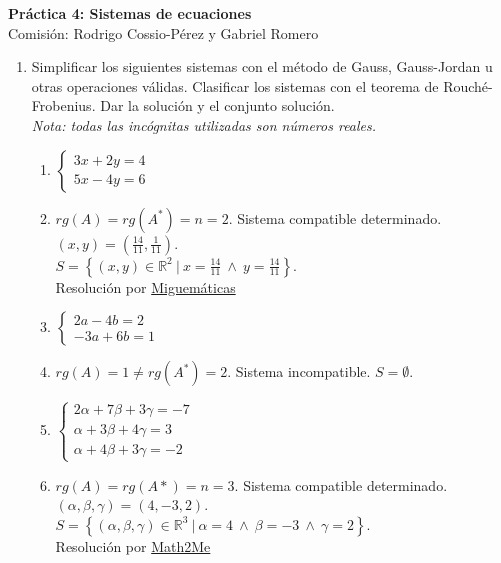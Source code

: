 \documentclass[a4paper]{article}
\newcommand{\answer}{\item[**]}
\newcommand{\exercise}{\item}
\begin{document}
\noindent \hrulefill 
\vspace{-7pt}
\begin{center} 
	\textbf{ Práctica 4: Sistemas de ecuaciones } \\
	Comisión: Rodrigo Cossio-Pérez y Gabriel Romero
\end{center}
\vspace{-10pt}
\hrulefill


\begin{enumerate}

	\exercise Simplificar los siguientes sistemas con el método de Gauss, Gauss-Jordan u otras operaciones válidas. Clasificar los sistemas con el teorema de Rouché-Frobenius. Dar la solución y el conjunto solución. \\ \textit{Nota: todas las incógnitas utilizadas son números reales.}
	\begin{multicols}{2}
	\begin{enumerate} [label=(\alph*)]
		\item $\left\{\begin{matrix} 3x+2y=4\\ 5x-4y=6 \end{matrix}\right.$
		\answer $rg(A)=rg(A^*)=n=2$. Sistema compatible determinado. \\ $(x,y)=\left(\frac{14}{11},\frac{1}{11}\right)$. \\ $S=\left\{(x,y)\in \mathbb{R}^2 ~|~ x=\frac{14}{11} ~\land~ y=\frac{14}{11}\right\}$. \\ Resolución por \href{https://youtu.be/OE8e70VO_CE}{Miguemáticas}

		\item $\left\{\begin{matrix} 2a-4b=2\\ -3a+6b=1 \end{matrix}\right.$
		\answer $rg(A) = 1 \neq rg(A^*) =2$. Sistema incompatible. $S=\emptyset$. 

		\item $\left\{\begin{matrix} 2\alpha+7\beta+3\gamma=-7 \\ \alpha+3\beta+4\gamma=3 \\ \alpha+4\beta+3\gamma=-2 \end{matrix}\right.$
		\answer $rg(A)=rg(A*)=n=3$. Sistema compatible determinado. \\ $(\alpha,\beta,\gamma)=(4,-3,2)$. \\ $S=\left\{(\alpha,\beta,\gamma)\in \mathbb{R}^3 ~|~ \alpha=4 ~\land~ \beta=-3 ~\land~ \gamma=2 \right\}$. \\ Resolución por \href{https://youtu.be/ZtMdsFXiFYQ}{Math2Me}


\end{enumerate}
\end{multicols}
\end{enumerate}
\end{document}
